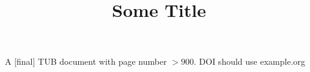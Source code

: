 \documentclass[final]{ltugboat}
\title{Some Title}
\begin{document}
\maketitle
A [final] TUB document with page number $>900$. DOI should use example.org
\end{document}
